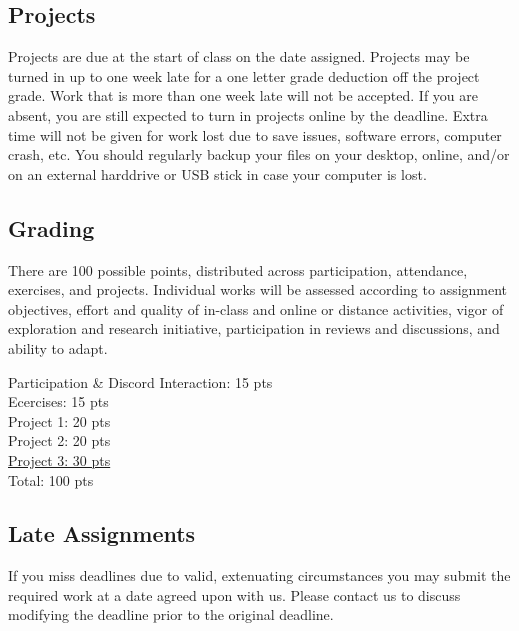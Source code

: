 \subsection{Projects}

Projects are due at the start of class on the date assigned. Projects may be turned in up to one week late for a one letter grade deduction off the project grade. Work that is more than one week late will not be accepted. If you are absent, you are still expected to turn in projects online by the deadline. Extra time will not be given for work lost due to save issues, software errors, computer crash, etc. You should regularly backup your files on your desktop, online, and/or on an external harddrive or USB stick in case your computer is lost.

\subsection{Grading}

There are 100 possible points, distributed across participation, attendance, exercises, and projects. Individual works will be assessed according to assignment objectives, effort and quality of in-class and online or distance activities, vigor of exploration and research initiative, participation in reviews and discussions, and ability to adapt.

\hspace*{1em} Participation \& Discord Interaction: 15 pts\\
\hspace*{1em} Ecercises: 15 pts\\
\hspace*{1em} Project 1: 20 pts\\
\hspace*{1em} Project 2: 20 pts\\
\hspace*{1em} \ul{Project 3: 30 pts}\\
\hspace*{1em} Total: 100 pts

\subsection{Late Assignments}

If you miss deadlines due to valid, extenuating circumstances you may submit the required work at a date agreed upon with us. Please contact us to discuss modifying the deadline prior to the original deadline.

